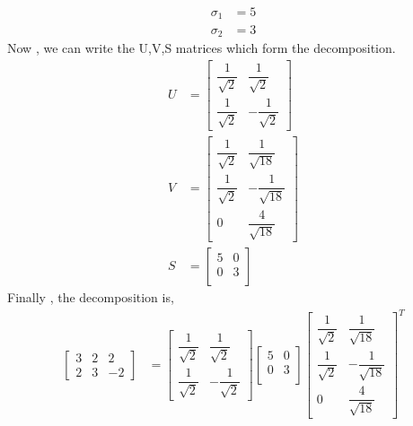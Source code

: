 \documentclass[12pt,a4paper]{article}
\begin{document}
{    \begin{align*}
        \sigma_1 &= 5 \\
        \sigma_2 &= 3
    \end{align*}
    Now , we can write the U,V,S matrices which form the decomposition.
    \begin{align*}
        U &= \begin{bmatrix}
                    \dfrac{1}{\sqrt{2}} & \dfrac{1}{\sqrt{2}} \\
                    \dfrac{1}{\sqrt{2}} & -\dfrac{1}{\sqrt{2}} 
                \end{bmatrix} \\
        V &= \begin{bmatrix}
                    \dfrac{1}{\sqrt{2}} & \dfrac{1}{\sqrt{18}} \\
                    \dfrac{1}{\sqrt{2}} & -\dfrac{1}{\sqrt{18}} \\
                    0 & \dfrac{4}{\sqrt{18}}
                \end{bmatrix} \\
        S &= \begin{bmatrix}
                5 & 0 \\
                0 & 3 \\
                \end{bmatrix} 
    \end{align*}
    Finally , the decomposition is,
    \begin{align*}
        \begin{bmatrix}
                    3 & 2 & 2\\
                    2 & 3 & -2
                \end{bmatrix} &= 
    \begin{bmatrix}
                    \dfrac{1}{\sqrt{2}} & \dfrac{1}{\sqrt{2}} \\
                    \dfrac{1}{\sqrt{2}} & -\dfrac{1}{\sqrt{2}} 
                \end{bmatrix}
    \begin{bmatrix}
                5 & 0 \\
                0 & 3 \\
                \end{bmatrix} 
    \begin{bmatrix}
                    \dfrac{1}{\sqrt{2}} & \dfrac{1}{\sqrt{18}} \\
                    \dfrac{1}{\sqrt{2}} & -\dfrac{1}{\sqrt{18}} \\
                    0 & \dfrac{4}{\sqrt{18}}
                \end{bmatrix}^T
                    \end{align*}

}
\end{document}
